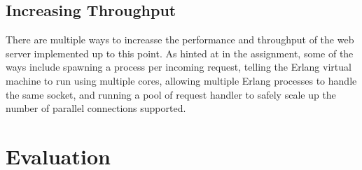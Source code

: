 \documentclass[a4paper, 11pt]{article}
\begin{document}
\subsection{Increasing Throughput}
There are multiple ways to increasse the performance and throughput of the web server implemented up to this point. As hinted at in the assignment, some of the ways include spawning a process per incoming request, telling the Erlang virtual machine to run using multiple cores, allowing multiple Erlang processes to handle the same socket, and running a pool of request handler to safely scale up the number of parallel connections supported.

\section{Evaluation}
\end{document}
